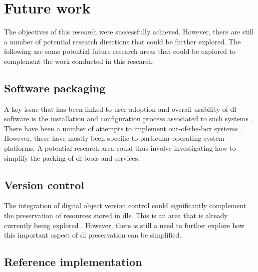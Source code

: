 \section{Future work}
\label{sec:conclusion:future-work}



The objectives of this research were successfully achieved. However, there are still a number of potential research directions that could be further explored. The following are some potential future research areas that could be explored to complement the work conducted in this research. 

\subsection{Software packaging}
\label{sec:conclusion:future-work:software-packaging}

A key issue that has been linked to user adoption and overall usability of \gls{dl} software is the installation and configuration process associated to such systems \citep{Korber2008}. There have been a number of attempts to implement out-of-the-box systems \citep{Maly2004,Eprints3APT2011}. However, these have mostly been specific to particular operating system platforms. A potential research area could thus involve investigating how to simplify the packing of \gls{dl} tools and services.

\subsection{Version control}
\label{sec:conclusion:future-work:version-control}

The integration of digital object version control could significantly complement the preservation of resources stored in \glspl{dl}. This is an area that is already currently being explored \citep{DSpace3Versioning2012}. However, there is still a need to further explore how this important aspect of \gls{dl} preservation can be simplified.

\subsection{Reference implementation}
\label{sec:conclusion:future-work:reference-implementation}

